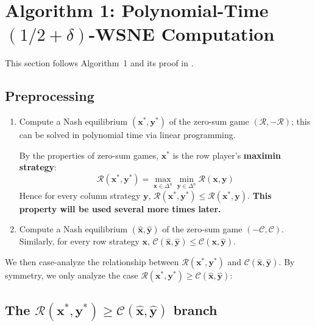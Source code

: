 \section{Algorithm 1: Polynomial-Time \texorpdfstring{\((1/2 + \delta)\)}{1/2 + δ}-WSNE Computation}

This section follows Algorithm~1 and its proof in \cite[Section~3]{12WSNE}.

\subsection{Preprocessing}

\begin{enumerate}
  \item Compute a Nash equilibrium \((\mathbf{x}^*, \mathbf{y}^*)\) of the zero-sum game \((\mathcal{R}, -\mathcal{R})\); this can be solved in polynomial time via linear programming.

        By the properties of zero-sum games, \(\mathbf{x}^*\) is the row player's \textbf{maximin strategy}:
        \[
          \mathcal{R}(\mathbf{x}^*, \mathbf{y}^*) = \max_{\mathbf{x} \in \Delta^n} \min_{\mathbf{y} \in \Delta^n} \mathcal{R}(\mathbf{x}, \mathbf{y})
        \]
        Hence for every column strategy \(\mathbf{y}\), \(\mathcal{R}(\mathbf{x}^*, \mathbf{y}^*) \le \mathcal{R}(\mathbf{x}^*, \mathbf{y})\). \textbf{This property will be used several more times later.}

  \item Compute a Nash equilibrium \((\hat{\mathbf{x}}, \hat{\mathbf{y}})\) of the zero-sum game \((-\mathcal{C}, \mathcal{C})\). Similarly, for every row strategy \(\mathbf{x}\), \(\mathcal{C}(\hat{\mathbf{x}}, \hat{\mathbf{y}}) \le \mathcal{C}(\mathbf{x}, \hat{\mathbf{y}})\).
\end{enumerate}

We then case-analyze the relationship between \(\mathcal{R}(\mathbf{x}^*, \mathbf{y}^*)\) and \(\mathcal{C}(\hat{\mathbf{x}}, \hat{\mathbf{y}})\). By symmetry, we only analyze the case \textbf{\(\mathcal{R}(\mathbf{x}^*, \mathbf{y}^*) \ge \mathcal{C}(\hat{\mathbf{x}}, \hat{\mathbf{y}})\)}:

\subsection{The \texorpdfstring{\(\mathcal{R}(\mathbf{x}^*, \mathbf{y}^*) \ge \mathcal{C}(\hat{\mathbf{x}}, \hat{\mathbf{y}})\)}{R(x*,y*) >= C(xh,yh)} branch}

